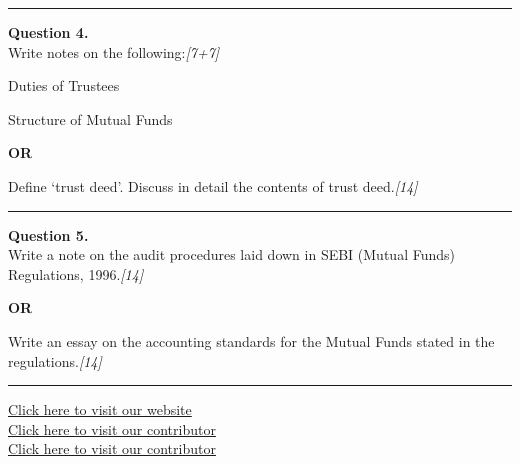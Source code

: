 \documentclass[11pt,a4paper]{article}
\newcommand{\pts}[1]{\hfill   \textit{[#1]}}
\begin{document}
\medskip\rule{\linewidth}{0.2pt}




\noindent   \textbf{Question 4.} \\
Write notes on the following:\pts{7+7}

\begin{parts}
  \item Duties of Trustees
  \item Structure of Mutual Funds
\end{parts}

\centerline{   \textbf{OR}}

Define `trust deed'. Discuss in detail the contents of trust deed.\pts{14}

\medskip\rule{\linewidth}{0.2pt}




\noindent   \textbf{Question 5.} \\
Write a note on the audit procedures laid down in SEBI (Mutual Funds) Regulations, 1996.\pts{14}

\centerline{   \textbf{OR}}

Write an essay on the accounting standards for the Mutual Funds stated in the regulations.\pts{14}

\vfill
\rule{\linewidth}{0.4pt}

\begin{center}\small
\href{https://bhu-exam.vercel.app/}{Click here to visit our website}\\[4pt]
\href{https://me-aryan.vercel.app/}{Click here to visit our contributor}\\[4pt]
\href{https://quashan-me.vercel.app/}{Click here to visit our contributor}
\end{center}
\end{document}
